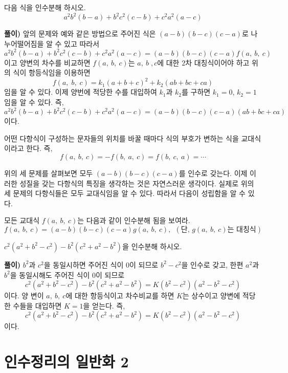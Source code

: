 \documentclass[a4paper]{article}
\begin{document}
\vspace{1em}
\begin{problem}
 다음 식을 인수분해 하시오.
\[
a^{2}b^{2}(b-a) + b^{2}c^{2}(c-b) + c^{2}a^{2}(a-c)
\]
\end{problem}
\textbf{풀이)} 앞의 문제와 예와 같은 방법으로 주어진 식은 $(a-b)(b-c)(c-a)$로 나누어떨어짐을 알 수 있고 따라서
\[
a^{2}b^{2}(b-a) + b^{2}c^{2}(c-b) + c^{2}a^{2}(a-c)=(a-b)(b-c)(c-a)f(a, \:b,\: c)
\]
이고 양변의 차수를 비교하면 $f(a,\:b, \:c)$는 $a,\:b\;,c$에 대한 $2$차 대칭식이어야 하고 위의 식이 항등식임을 이용하면 
$$
f(a,\;b,\;c) = k_{1}(a+b+c)^2 + k_{2}(ab +bc +ca)
$$
임을 알 수 있다. 이제 양번에 적당한 수를 대입하여 $k_{1}$과 $k_{2}$를 구하면 
$k_{1}=0$, $k_{2}=1$임을 알 수 있다.
즉,
\[
a^{2}b^{2}(b-a) + b^{2}c^{2}(c-b) + c^{2}a^{2}(a-c)=(a-b)(b-c)(c-a)(ab+bc+ca)
\]
이다.
\vspace{1em}
\begin{definition}
  어떤 다항식이 구성하는 문자들의 위치를 바꿀 때마다 식의 부호가 변하는 식을 교대식이라고 한다. 즉,
  \[
  f(a,\: b,\: c) = - f(b, \:a, \: c) = f(b,\: c,\: a) = \cdots
  \]
\end{definition}
  위의 세 문제를 살펴보면 모두 $(a-b)(b-c)(c-a)$를 인수로 갖는다. 이제 이러한 성질을 갖는 다항식의 특징을 생각하는 것은 자연스러운 생각이다. 실제로 위의 세 문제의 다항식들은 모두 교대식임을 알 수 있다. 따라서 다음이 성립함을 알 수 있다.
  \vspace{1em}
  
\begin{theorem}
모든 교대식 $f(a,\:b,\:c)$는 다음과 같이 인수분해 됨을 보여라.
$$ f(a,\:b,\:c) = (a-b)(b-c)(c-a)g(a,\:b,\:c), \:\:(\text{단, }g(a,\:b,\:c)\text{는 대칭식})$$
\end{theorem}

\begin{problem}
 $c^{2}(a^2 + b^2 - c^2 ) - b^{2}(c^2 + a^2 - b^2 )$을 인수분해 하시오.
\end{problem}

\textbf{풀이)} $b^2$과 $c^2$을 동일시하면 주어진 식이 $0$이 되므로 $b^2 - c^2$을 인수로 갖고, 한편 $a^2$과 $b^2$을 동일시해도 주어진 식이 $0$이 되므로
\[
c^{2}(a^2 + b^2 - c^2 ) - b^{2}(c^2 + a^2 - b^2 ) = K (b^2 - c^2 )(a^2 -b^2 -c^2 )
\]
이다. 양 변이 $a,\:b,\: c$에 대한 항등식이고 차수비교를 하면 $K$는 상수이고 양변에 적당한 수들을 대입하면 $K=1$을 얻는다. 즉,
\[
c^{2}(a^2 + b^2 - c^2 ) - b^{2}(c^2 + a^2 - b^2 ) = K (b^2 - c^2 )(a^2 -b^2 -c^2 )
\]
이다.

\section{인수정리의 일반화 2}
\end{document}
